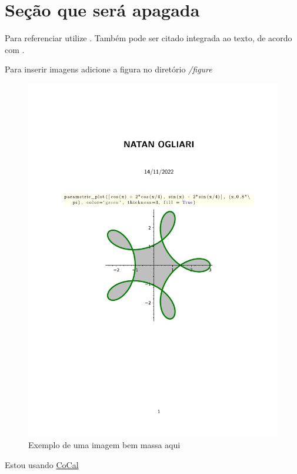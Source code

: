 \section{Seção que será apagada}

Para referenciar utilize \cite{ninguem2022curioso}. Também pode ser citado integrada ao texto, de acordo com .

Para inserir imagens adicione a figura no diretório \textit{/figure}

\begin{figure}[H]
\centering
\includegraphics[width=1\textwidth]{figure/Welcome to CoCalc.pdf}
\caption{Exemplo de uma imagem bem massa aqui}
\label{fig:imagem_massa}
\end{figure}

\par Estou usando \href {https://cocalc.com/} {CoCal}

